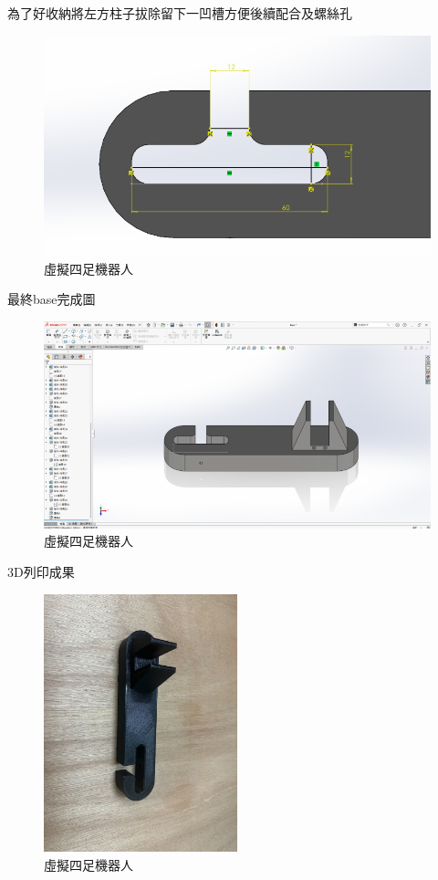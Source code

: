 \noindent 為了好收納將左方柱子拔除留下一凹槽方便後續配合及螺絲孔

\begin{figure}[h!]
    \centering
    \includegraphics[width=1\textwidth]{./../images/6-1-38.png}
    \caption{\Large 虛擬四足機器人}
\end{figure}

\noindent 最終base完成圖

\begin{figure}[h!]
    \centering
    \includegraphics[width=1\textwidth]{./../images/6-1-39.png}
    \caption{\Large 虛擬四足機器人}
\end{figure}

\noindent 3D列印成果

\begin{figure}[h!]
    \centering
    \includegraphics[width=0.5\textwidth]{./../images/6-1-25.JPG}
    \caption{\Large 虛擬四足機器人}
\end{figure}


